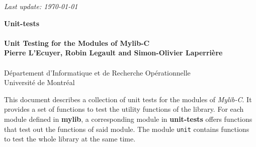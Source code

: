 \begin{titlepage}

\null 
\begin {flushright} \it Last update: \today \end {flushright}

\vfill
\begin{center}
 {\Large\bf Unit-tests} \\ \ \\
 {\large\bf Unit Testing for the Modules of Mylib-C}\\
\vfill
 {\bf Pierre L'Ecuyer, Robin Legault and Simon-Olivier Laperrière} \\ \ \\
\medskip
D\'epartement d'Informatique et de Recherche Op\'erationnelle \\
Universit\'e de Montr\'eal \\
\end{center}
\vfill

This document describes a collection of unit tests for the modules of \emph{Mylib-C}. It provides
a set of functions to test the utility functions of the library.
For each module defined in {\bf mylib}, a corresponding module in {\bf unit-tests} offers functions that test out the functions of said module. The module {\tt unit} contains functions to test the whole library at the same time.

\vfill
\end{titlepage}

